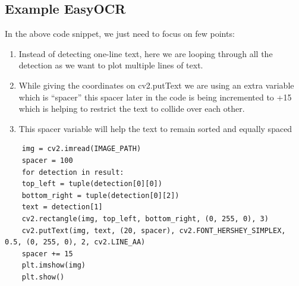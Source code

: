 \subsection{Example EasyOCR}
In the above code snippet, we just need to focus on few points:
\begin{enumerate}
	\item Instead of detecting one-line text, here we are looping through all the detection as we want to plot multiple lines of text.
	\item While giving the coordinates on cv2.putText we are using an extra variable which is “spacer” this spacer later in the code is being incremented to +15 which is helping to restrict the text to collide over each other.
	\item This spacer variable will help the text to remain sorted and equally spaced
\end{enumerate}
\begin{lstlisting}
	img = cv2.imread(IMAGE_PATH)
	spacer = 100
	for detection in result:
	top_left = tuple(detection[0][0])
	bottom_right = tuple(detection[0][2])
	text = detection[1]
	cv2.rectangle(img, top_left, bottom_right, (0, 255, 0), 3)
	cv2.putText(img, text, (20, spacer), cv2.FONT_HERSHEY_SIMPLEX, 0.5, (0, 255, 0), 2, cv2.LINE_AA)
	spacer += 15
	plt.imshow(img)
	plt.show()
\end{lstlisting}
